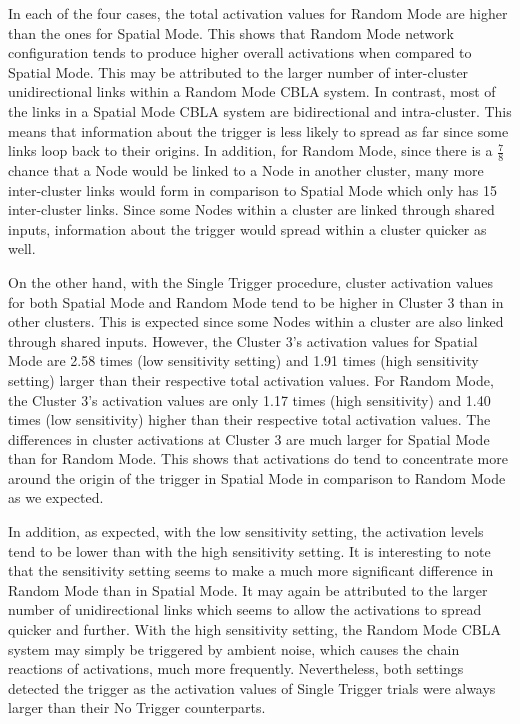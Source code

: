 In each of the four cases, the total activation values for Random Mode are higher than the ones for Spatial Mode. This shows that Random Mode network configuration tends to produce higher overall activations when compared to Spatial Mode. This may be attributed to the larger number of inter-cluster unidirectional links within a Random Mode CBLA system. In contrast, most of the links in a Spatial Mode CBLA system are bidirectional and intra-cluster. This means that information about the trigger is less likely to spread as far since some links loop back to their origins. In addition, for Random Mode, since there is a $\frac{7}{8}$ chance that a Node would be linked to a Node in another cluster, many more inter-cluster links would form in comparison to Spatial Mode which only has 15 inter-cluster links. Since some Nodes within a cluster are linked through shared inputs, information about the trigger would spread within a cluster quicker as well. 

On the other hand, with the Single Trigger procedure, cluster activation values for both Spatial Mode and Random Mode tend to be higher in Cluster 3 than in other clusters. This is expected since some Nodes within a cluster are also linked through shared inputs. However, the Cluster 3's activation values for Spatial Mode are 2.58 times (low sensitivity setting) and 1.91 times (high sensitivity setting) larger than their respective total activation values. For Random Mode, the Cluster 3's activation values are only 1.17 times (high sensitivity) and 1.40 times (low sensitivity) higher than their respective total activation values. The differences in cluster activations at Cluster 3 are much larger for Spatial Mode than for Random Mode. This shows that activations do tend to concentrate more around the origin of the trigger in Spatial Mode in comparison to Random Mode as we expected. 

In addition, as expected, with the low sensitivity setting, the activation levels tend to be lower than with the high sensitivity setting. It is interesting to note that the sensitivity setting seems to make a much more significant difference in Random Mode than in Spatial Mode. It may again be attributed to the larger number of unidirectional links which seems to allow the activations to spread quicker and further. With the high sensitivity setting, the Random Mode CBLA system may simply be triggered by ambient noise, which causes the chain reactions of activations, much more frequently.
Nevertheless, both settings detected the trigger as the activation values of Single Trigger trials were always larger than their No Trigger counterparts.

